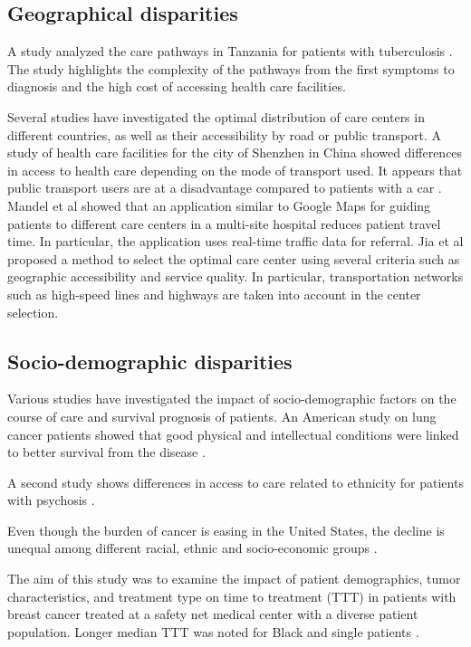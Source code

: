 \subsection*{Geographical disparities}

A study analyzed the care pathways in Tanzania for patients with tuberculosis
\cite{mhalu_pathways_2019}. The study highlights the complexity of the pathways
from the first symptoms to diagnosis and the high cost of accessing health care
facilities.

Several studies have investigated the optimal distribution of care centers in
different countries, as well as their accessibility by road or public transport.
A study of health care facilities for the city of Shenzhen in China showed
differences in access to health care depending on the mode of transport used. It
appears that public transport users are at a disadvantage compared to patients
with a car \cite{tao_spatial_2018}. Mandel et al \cite{mandel_optimizing_2018}
showed that an application similar to Google Maps for guiding patients to
different care centers in a multi-site hospital reduces patient travel time. In
particular, the application uses real-time traffic data for referral. Jia et al
\cite{jia_selecting_2014} proposed a method to select the optimal care center
using several criteria such as geographic accessibility and service quality. In
particular, transportation networks such as high-speed lines and highways are
taken into account in the center selection.

\subsection*{Socio-demographic disparities}

Various studies have investigated the impact of socio-demographic factors on the
course of care and survival prognosis of patients. An American study on lung
cancer patients showed that good physical and intellectual conditions were
linked to better survival from the disease
\cite{pierzynski_socio-demographic_2018}.

A second study shows differences in access to care related to ethnicity for
patients with psychosis \cite{anderson_meta-analysis_2014}.

Even though the burden of cancer is easing in the United States, the decline is
unequal among different racial, ethnic and socio-economic groups
\cite{viswanath_science_2005}.

The aim of this study was to examine the impact of patient demographics, tumor
characteristics, and treatment type on time to treatment (TTT) in patients with
breast cancer treated at a safety net medical center with a diverse patient
population. Longer median TTT was noted for Black and single patients
\cite{khanna_impact_2017}.

